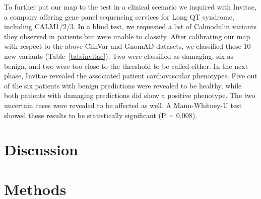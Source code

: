 To further put our map to the test in a clinical scenario we inquired with Invitae, a company offering gene panel sequencing services for Long QT syndrome, including CALM1/2/3. In a blind test, we requested a list of Calmodulin variants they observed in patients but were unable to classify. After calibrating our map with respect to the above ClinVar and GnomAD datasets, we classified these 10 new variants (Table~\ref{tab:invitae}). Two were classified as damaging, six as benign, and two were too close to the threshold to be called either. In the next phase, Invitae revealed the associated patient cardiovascular phenotypes. Five out of the six patients with benign predictions were revealed to be healthy, while both patients with damaging predictions did show a positive phenotype. The two uncertain cases were revealed to be affected as well. A Mann-Whitney-U test showed these results to be statistically significant (P = 0.008).

		

\section{Discussion}

\section{Methods}


